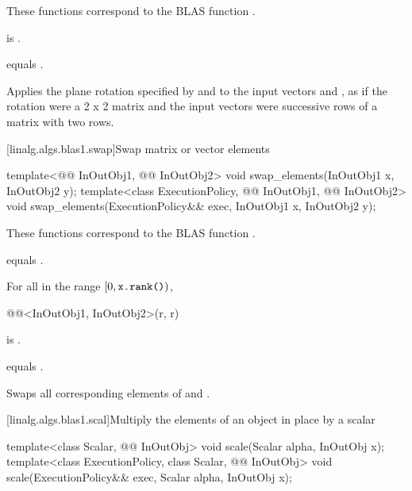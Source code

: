 \begin{itemdescr}
\pnum
\begin{note}
These functions correspond to the BLAS function .
\end{note}

\pnum
\mandates
{} is .

\pnum
\expects
{} equals .

\pnum
\effects
Applies the plane rotation
specified by  and  to
the input vectors  and ,
as if the rotation were a 2 x 2 matrix and
the input vectors were successive rows of a matrix with two rows.
\end{itemdescr}

[linalg.algs.blas1.swap]{Swap matrix or vector elements}

\begin{itemdecl}
template<@@ InOutObj1, @@ InOutObj2>
  void swap_elements(InOutObj1 x, InOutObj2 y);
template<class ExecutionPolicy, @@ InOutObj1, @@ InOutObj2>
  void swap_elements(ExecutionPolicy&& exec, InOutObj1 x, InOutObj2 y);
\end{itemdecl}

\begin{itemdescr}
\pnum
\begin{note}
These functions correspond to the BLAS function .
\end{note}

\pnum
\constraints
{} equals .

\pnum
\mandates
For all  in the range $[0, \texttt{\protect x.rank()})$,
\begin{codeblock}
@@<InOutObj1, InOutObj2>(r, r)
\end{codeblock}
is .

\pnum
\expects
{} equals .

\pnum
\effects
Swaps all corresponding elements of  and .
\end{itemdescr}

[linalg.algs.blas1.scal]{Multiply the elements of an object in place by a scalar}

\begin{itemdecl}
template<class Scalar, @@ InOutObj>
  void scale(Scalar alpha, InOutObj x);
template<class ExecutionPolicy, class Scalar, @@ InOutObj>
  void scale(ExecutionPolicy&& exec, Scalar alpha, InOutObj x);
\end{itemdecl}

